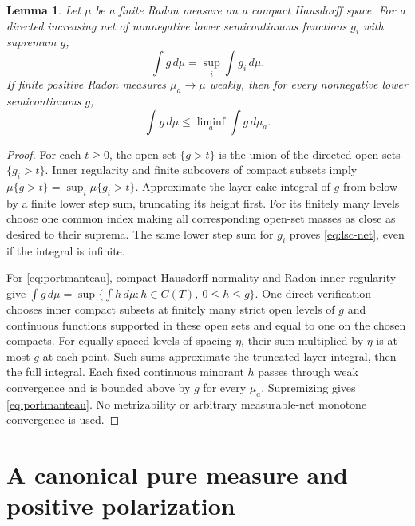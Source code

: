 \documentclass[11pt]{article}
\newtheorem{lemma}[theorem]{Lemma}
\begin{document}
\begin{lemma}\label{lem:radon}
Let $\mu$ be a finite Radon measure on a compact Hausdorff space.
For a directed increasing net of nonnegative lower semicontinuous
functions $g_i$ with supremum $g$,
\begin{equation}\label{eq:lsc-net}
 \int g\,d\mu=\sup_i\int g_i\,d\mu.
\end{equation}
If finite positive Radon measures $\mu_a\to\mu$ weakly, then for
every nonnegative lower semicontinuous $g$,
\begin{equation}\label{eq:portmanteau}
 \int g\,d\mu\leq\liminf_a\int g\,d\mu_a.
\end{equation}
\end{lemma}
\begin{proof}
For each $t\geq0$, the open set $\{g>t\}$ is the union of the
directed open sets $\{g_i>t\}$. Inner regularity and finite subcovers
of compact subsets imply
$\mu\{g>t\}=\sup_i\mu\{g_i>t\}$. Approximate the layer-cake
integral of $g$ from below by a finite lower step sum, truncating its
height first. For its finitely many levels choose one common index
making all corresponding open-set masses as close as desired to
their suprema. The same lower step sum for $g_i$ proves
\eqref{eq:lsc-net}, even if the integral is infinite.

For \eqref{eq:portmanteau}, compact Hausdorff normality and Radon
inner regularity give
$\int g\,d\mu=\sup\{\int h\,d\mu: h\in C(T),\ 0\leq h\leq g\}$.
One direct verification chooses inner compact subsets at finitely
many strict open levels of $g$ and continuous functions supported
in these open sets and equal to one on the chosen compacts. For
equally spaced levels of spacing $\eta$, their sum multiplied by
$\eta$ is at most $g$ at each point. Such sums approximate the
truncated layer integral, then the full integral. Each fixed
continuous minorant $h$ passes through weak convergence and is
bounded above by $g$ for every $\mu_a$. Supremizing gives
\eqref{eq:portmanteau}. No metrizability or arbitrary measurable-net
monotone convergence is used.
\end{proof}

\section{A canonical pure measure and positive polarization}
\end{document}
